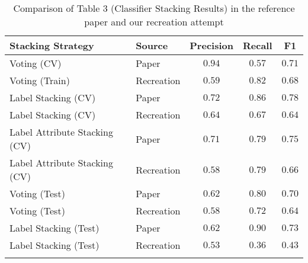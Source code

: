 


\begin{table*}[h]
	\begin{tabular}{|l|l|ccc|}
		\hline
		Stacking Strategy & Source & Precision & Recall & F1 \\
		\hline
		Voting (CV) & Paper & $0.94$ & $0.57$ & $0.71$ \\
		Voting (Train) & Recreation & $0.59$ & $0.82$ & $0.68$ \\
		\hline
		Label Stacking (CV) & Paper & $0.72$ & $0.86$ & $0.78$ \\
		Label Stacking (CV) & Recreation & $0.64$ & $0.67$ & $0.64$ \\
		\hline
		Label Attribute Stacking (CV) & Paper & $0.71$ & $0.79$ & $0.75$ \\
		Label Attribute Stacking (CV) & Recreation & $0.58$ & $0.79$ & $0.66$ \\
		\hline
		Voting (Test) & Paper & $0.62$ & $0.80$ & $0.70$ \\
		Voting (Test) & Recreation & $0.58$ & $0.72$ & $0.64$ \\
		\hline
		Label Stacking (Test) & Paper & $0.62$ & $0.90$ & $0.73$ \\
		Label Stacking (Test) & Recreation & $0.53$ & $0.36$ & $0.43$ \\
		\hline
		\multicolumn{5}{c}{ } \\
	\end{tabular}
	\caption{Comparison of Table 3 (Classifier Stacking Results) in the reference paper and our recreation attempt}
	\label{table3}
\end{table*}